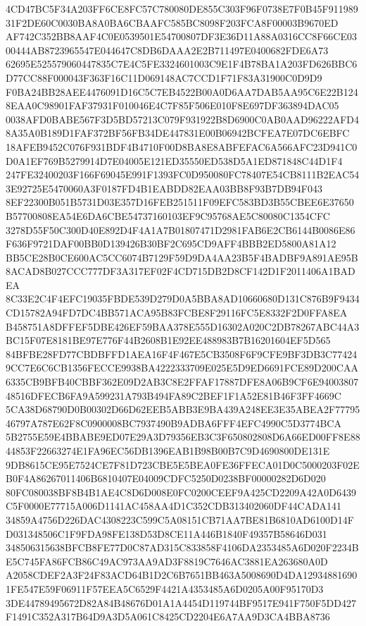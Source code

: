 \documentclass[UTF8,fontset=fandol,zihao=-4,a4paper]{ctexart}
\begin{document}
{{4CD47BC5F34A203FF6CE8FC57C780080DE855C303F96F0738E7F0B45F91198931F2DE60C0030BA8A0BA6CBAAFC585BC8098F203FCA8F00003B9670ED
AF742C352BB8AAF4C0E0539501E54700807DF3E36D11A88A0316CC8F66CE0300444AB8723965547E044647C8DB6DAAA2E2B711497E0400682FDE6A73
62695E525579060447835C7E4C5FE3324601003C9E1F4B78BA1A203FD626BBC6D77CC88F000043F363F16C11D069148AC7CCD1F71F83A31900C0D9D9
F0BA24BB28AEE4476091D16C5C7EB4522B00A0D6AA7DAB5AA95C6E22B1248EAA0C98901FAF37931F010046E4C7F85F506E010F8E697DF363894DAC05
0038AFD0BABE567F3D5BD57213C079F931922B8D6900C0AB0AAD96222AFD48A35A0B189D1FAF372BF56FB34DE447831E00B06942BCFEA7E07DC6EBFC
18AFEB9452C076F931BDF4B4710F00D8BA8E8ABFEFAC6A566AFC23D941C0D0A1EF769B5279914D7E04005E121ED35550ED538D5A1ED871848C44D1F4
247FE32400203F166F69045E991F1393FC0D950080FC78407E54CB8111B2EAC543E92725E5470060A3F0187FD4B1EABDD82EAA03BB8F93B7DB94F043
8EF22300B051B5731D03E357D16FEB251511F09EFC583BD3B55CBEE6E37650B57700808EA54E6DA6CBE54737160103EF9C95768AE5C80080C1354CFC
3278D55F50C300D40E892D4F4A1A7B01807471D2981FAB6E2CB6144B0086E86F636F9721DAF00BB0D139426B30BF2C695CD9AFF4BBB2ED5800A81A12
BB5CE28B0CE600AC5CC6074B7129F59D9DA4AA23B5F4BADBF9A891AE95B8ACAD8B027CCC777DF3A317EF02F4CD715DB2D8CF142D1F2011406A1BADEA
8C33E2C4F4EFC19035FBDE539D279D0A5BBA8AD10660680D131C876B9F9434CD15782A94FD7DC4BB571ACA95B83FCBE8F29116FC5E8332F2D0FFA8EA
B458751A8DFFEF5DBE426EF59BAA378E555D16302A020C2DB78267ABC44A3BC15F07E8181BE97E776F44B2608B1E92EE488983B7B16201604EF5D565
84BFBE28FD77CBDBFFD1AEA16F4F467E5CB3508F6F9CFE9BF3DB3C774249CC7E6C6CB1356FECCE9938BA4222333709E025E5D9ED6691FCE89D200CAA
6335CB9BFB40CBBF362E09D2AB3C8E2FFAF17887DFE8A06B9CF6E9400380748516DFECB6FA9A599231A793B494FA89C2BEF1F1A52E81B46F3FF4669C
5CA38D68790D0B00302D66D62EEB5ABB3E9BA439A248EE3E35ABEA2F7779546797A787E62F8C0900008BC7937490B9ADBA6FFF4EFC4990C5D3774BCA
5B2755E59E4BBABE9ED07E29A3D79356EB3C3F650802808D6A66ED00FF8E8844853F22663274E1FA96EC56DB1396EAB1B98B00B7C9D4690800DE131E
9DB8615CE95E7524CE7F81D723CBE5E5BEA0FE36FFECA01D0C5000203F02EB0F4A86267011406B6810407E04009CDFC5250D0238BF00000282D6D020
80FC080038BF8B4B1AE4C8D6D008E0FC0200CEEF9A425CD2209A42A0D6439C5F0000E77715A006D1141AC458AA4D1C352CDB313402060DF44CADA141
34859A4756D226DAC4308223C599C5A08151CB71AA7BE81B6810AD6100D14FD031348506C1F9FDA98FE138D53D8CE11A446B1840F49357B58646D031
348506315638BFCB8FE77D0C87AD315C833858F4106DA2353485A6D020F2234BE5C745FA86FCB86C49AC973AA9AD3F8819C7646AC3881EA263680A0D
A2058CDEF2A3F24F83ACD64B1D2C6B7651BB463A5008690D4DA129348816901FE547E59F06911F57EEA5C6529F4421A4353485A6D0205A00F95170D3
3DE44789495672D82A84B48676D01A1A4454D119744BF9517E941F750F5DD427F1491C352A317B64D9A3D5A061C8425CD2204E6A7AA9D3CA4BBA8736
}}
\end{document}
